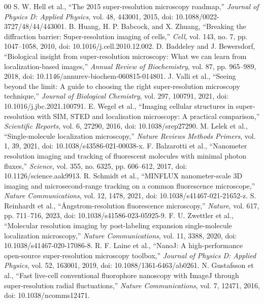 \documentclass[conference]{IEEEtran}
\begin{document}
\begin{thebibliography}{00}
 S. W. Hell et al., ``The 2015 super-resolution microscopy roadmap,'' \emph{Journal of Physics D: Applied Physics}, vol. 48, 443001, 2015, doi: 10.1088/0022-3727/48/44/443001.
 B. Huang, H. P. Babcock, and X. Zhuang, ``Breaking the diffraction barrier: Super-resolution imaging of cells,'' \emph{Cell}, vol. 143, no. 7, pp. 1047--1058, 2010, doi: 10.1016/j.cell.2010.12.002.
 D. Baddeley and J. Bewersdorf, ``Biological insight from super-resolution microscopy: What we can learn from localization-based images,'' \emph{Annual Review of Biochemistry}, vol. 87, pp. 965--989, 2018, doi: 10.1146/annurev-biochem-060815-014801.
 J. Valli et al., ``Seeing beyond the limit: A guide to choosing the right super-resolution microscopy technique,'' \emph{Journal of Biological Chemistry}, vol. 297, 100791, 2021, doi: 10.1016/j.jbc.2021.100791.
 E. Wegel et al., ``Imaging cellular structures in super-resolution with SIM, STED and localisation microscopy: A practical comparison,'' \emph{Scientific Reports}, vol. 6, 27290, 2016, doi: 10.1038/srep27290.
 M. Lelek et al., ``Single-molecule localization microscopy,'' \emph{Nature Reviews Methods Primers}, vol. 1, 39, 2021, doi: 10.1038/s43586-021-00038-x.
 F. Balzarotti et al., ``Nanometer resolution imaging and tracking of fluorescent molecules with minimal photon fluxes,'' \emph{Science}, vol. 355, no. 6325, pp. 606--612, 2017, doi: 10.1126/science.aak9913.
 R. Schmidt et al., ``MINFLUX nanometer-scale 3D imaging and microsecond-range tracking on a common fluorescence microscope,'' \emph{Nature Communications}, vol. 12, 1478, 2021, doi: 10.1038/s41467-021-21652-z.
 S. Reinhardt et al., ``\AA ngstrom-resolution fluorescence microscopy,'' \emph{Nature}, vol. 617, pp. 711--716, 2023, doi: 10.1038/s41586-023-05925-9.
 F. U. Zwettler et al., ``Molecular resolution imaging by post-labeling expansion single-molecule localization microscopy,'' \emph{Nature Communications}, vol. 11, 3388, 2020, doi: 10.1038/s41467-020-17086-8.
 R. F. Laine et al., ``NanoJ: A high-performance open-source super-resolution microscopy toolbox,'' \emph{Journal of Physics D: Applied Physics}, vol. 52, 163001, 2019, doi: 10.1088/1361-6463/ab0261.
 N. Gustafsson et al., ``Fast live-cell conventional fluorophore nanoscopy with ImageJ through super-resolution radial fluctuations,'' \emph{Nature Communications}, vol. 7, 12471, 2016, doi: 10.1038/ncomms12471.
\end{thebibliography}
\end{document}
